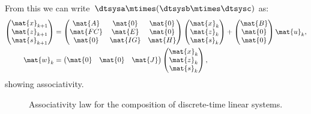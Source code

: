 From this we can write~$\dtsysa\mtimes (\dtsysb\mtimes \dtsysc)$ as:
\begin{equation*}
	\label{eq:dlin-7}
	\begin{aligned}
		\begin{pmatrix}
			\mat{x}_{k+1} \\
			\mat{z}_{k+1} \\
			\mat{s}_{k+1}
		\end{pmatrix} & =
		\begin{pmatrix}
			\mat{A}  & \mat{0}  & \mat{0} \\
			\mat{FC} & \mat{E}  & \mat{0} \\
			\mat{0}  & \mat{IG} & \mat{H}
		\end{pmatrix}
		\begin{pmatrix}
			\mat{x}_k \\ \mat{z}_k\\ \mat{s}_k
		\end{pmatrix}+
		\begin{pmatrix}
			\mat{B} \\ \mat{0}\\ \mat{0}
		\end{pmatrix}\mat{u}_k, \\
		\mat{w}_k                  & =
		\begin{pmatrix}
			\mat{0} & \mat{0} & \mat{J}
		\end{pmatrix}
		\begin{pmatrix}
			\mat{x}_k \\ \mat{z}_k\\ \mat{s}_k
		\end{pmatrix},
	\end{aligned}
\end{equation*}
showing associativity.

\begin{figure}[tbh]
	\centering
	\prflinepadbefore=5pt
	\prflinepadafter=5pt
	{
	}
	\caption{Associativity law for the composition of discrete-time linear systems. }
	\label{fig:ass_dyn_syst}
\end{figure}

